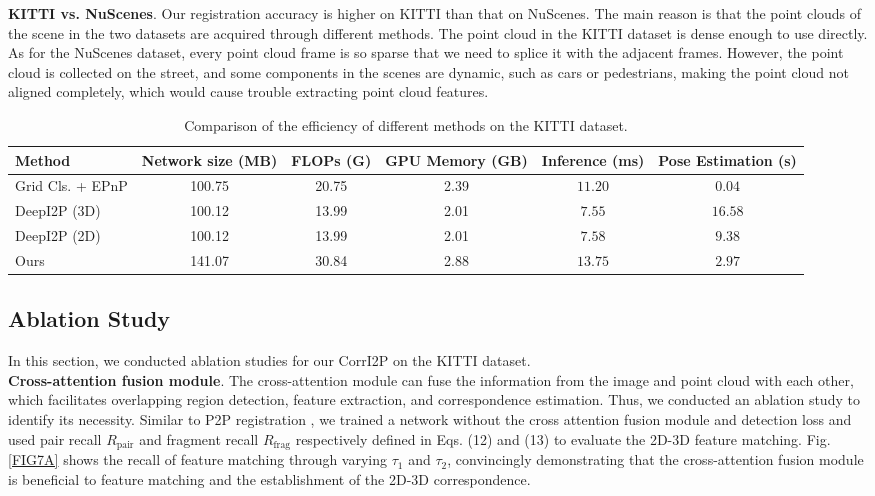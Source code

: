 \documentclass[lettersize,journal]{IEEEtran}
\begin{document}
\noindent\textbf{KITTI vs. NuScenes}.
Our registration accuracy is higher on   KITTI than that on NuScenes. The main reason is that the point clouds of the scene in the two datasets are acquired through different methods. The point cloud in the KITTI dataset is dense enough to use directly.
As for the NuScenes dataset, every point cloud frame is so sparse that we need to splice it with the adjacent frames. However, the point cloud is collected on the street, and some components in the scenes are dynamic, such as cars or pedestrians, making the point cloud not aligned completely, which would cause trouble extracting point cloud features.

\begin{table*}[h]
    \centering
    \renewcommand\arraystretch{1.5}
    \caption{Comparison of the efficiency of different methods on the KITTI dataset.}
\begin{tabular}{l|c|c|c|c|c}
    \hline\hline
     Method &  Network size (MB) & FLOPs (G) & GPU Memory (GB) &Inference (ms) & Pose Estimation (s)  \\
    \hline
    Grid Cls. + EPnP   &  100.75  & 20.75  & 2.39  & $11.20$   & $0.04$\\
    \hline
    DeepI2P (3D)  & 100.12 & 13.99 & 2.01  &$7.55$    & $16.58$\\
DeepI2P (2D) & 100.12 & 13.99 & 2.01  & $7.58$    & $9.38$\\
    \hline
    Ours         & 141.07    & 30.84 & 2.88 &  $13.75$   & $2.97$  \\
    \hline\hline
    \end{tabular}   \label{TAB4}
\end{table*}


\subsection{Ablation Study}
In this section, we conducted ablation studies for our CorrI2P on the KITTI dataset. \\


\noindent\textbf{Cross-attention fusion module}.
The cross-attention module can fuse the information from the image and point cloud with each other, which facilitates overlapping region detection, feature extraction, and correspondence estimation. Thus, we conducted an ablation study to identify its necessity. Similar to P2P registration \cite{PPFNET}, we trained a network without the cross attention fusion module and detection loss and used pair recall $R_\text{pair}$ and fragment recall $R_\text{frag}$ respectively defined in Eqs. (12) and (13) to evaluate the 2D-3D feature matching. 
Fig. \ref{FIG7A} shows the recall of feature matching through varying $\tau_1$ and $\tau_2$, convincingly demonstrating that the cross-attention fusion module is beneficial to feature matching and the establishment of the 2D-3D correspondence. \\
\end{document}
